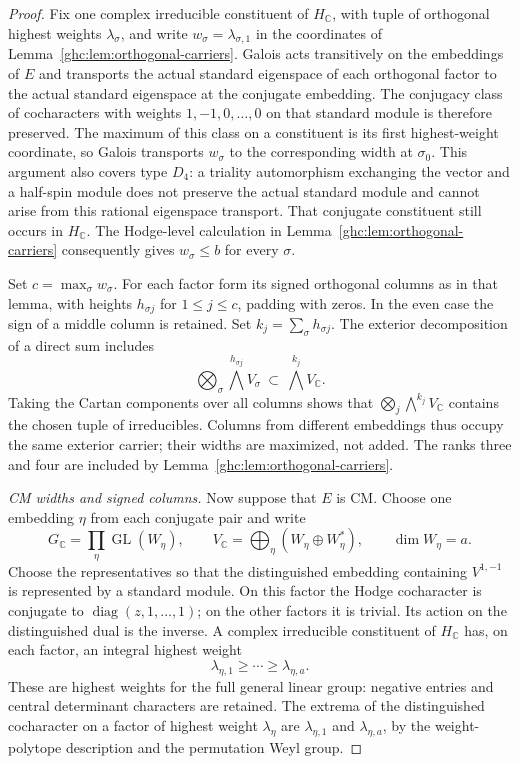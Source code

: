 \documentclass[11pt]{amsart}
\newcommand{\C}{\mathbb C}
\DeclareMathOperator{\GL}{GL}
\theoremstyle{definition}
\theoremstyle{remark}
\numberwithin{equation}{section}
\begin{document}
\begin{proof}
Fix one complex irreducible constituent of $H_\C$, with tuple of
orthogonal highest weights $\lambda_\sigma$, and write
$w_\sigma=\lambda_{\sigma,1}$ in the coordinates of
Lemma~\ref{ghc:lem:orthogonal-carriers}.  Galois acts transitively
on the embeddings of $E$ and transports the actual standard
eigenspace of each orthogonal factor to the actual standard
eigenspace at the conjugate embedding.  The conjugacy class of
cocharacters with weights $1,-1,0,\ldots,0$ on that standard module
is therefore preserved.  The maximum of this class on a constituent
is its first highest-weight coordinate, so Galois transports
$w_\sigma$ to the corresponding width at $\sigma_0$.  This argument
also covers type $D_4$: a triality automorphism exchanging the vector
and a half-spin module does not preserve the actual standard module
and cannot arise from this rational eigenspace transport.  That
conjugate constituent still occurs in $H_\C$.
The Hodge-level calculation in
Lemma~\ref{ghc:lem:orthogonal-carriers} consequently gives
$w_\sigma\le b$ for every $\sigma$.

Set $c=\max_\sigma w_\sigma$.  For each factor form its signed
orthogonal columns as in that lemma, with heights
$h_{\sigma j}$ for $1\le j\le c$, padding with zeros.  In the
even case the sign of a middle column is retained.  Set
$k_j=\sum_\sigma h_{\sigma j}$.  The exterior decomposition
of a direct sum includes
\[
 \bigotimes_\sigma\bigwedge^{h_{\sigma j}}V_\sigma
       \ \subset\ \bigwedge^{k_j}V_\C.
\]
Taking the Cartan components over all columns shows that
$\bigotimes_j\bigwedge^{k_j}V_\C$ contains the chosen tuple
of irreducibles.  Columns from different embeddings thus occupy
the same exterior carrier; their widths are maximized, not added.
The ranks three and four are included by
Lemma~\ref{ghc:lem:orthogonal-carriers}.

\emph{CM widths and signed columns.}
Now suppose that $E$ is CM.  Choose one embedding $\eta$ from
each conjugate pair and write
\[
 G_\C=\prod_\eta\GL(W_\eta),\qquad
 V_\C=\bigoplus_\eta(W_\eta\oplus W_\eta^*),
 \qquad \dim W_\eta=a.
\]
Choose the representatives so that the distinguished embedding
containing $V^{1,-1}$ is represented by a standard module.  On
this factor the Hodge cocharacter is conjugate to
$\operatorname{diag}(z,1,\ldots,1)$; on the other factors it is
trivial.  Its action on the distinguished dual is the inverse.
A complex irreducible constituent of $H_\C$ has, on each factor,
an integral highest weight
\[
 \lambda_{\eta,1}\ge\cdots\ge\lambda_{\eta,a}.
\]
These are highest weights for the full general linear group:
negative entries and central determinant characters are retained.
The extrema of the distinguished cocharacter on a factor of
highest weight $\lambda_\eta$ are
$\lambda_{\eta,1}$ and $\lambda_{\eta,a}$, by the weight-polytope
description and the permutation Weyl group.


\end{proof}
\end{document}
